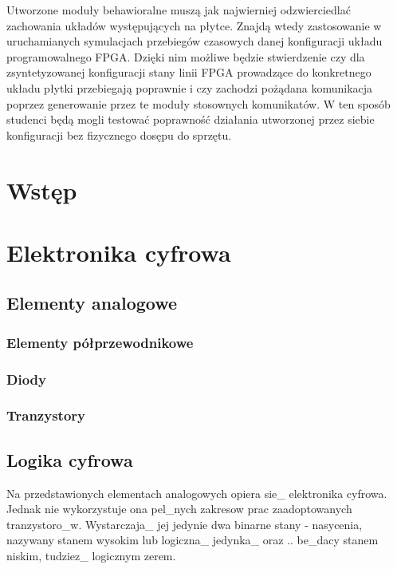 \documentclass[a4paper,12pt]{article}
\begin{document}
Utworzone moduły behawioralne muszą jak najwierniej odzwierciedlać zachowania układów występujących na płytce.
Znajdą wtedy zastosowanie w uruchamianych symulacjach przebiegów czasowych danej konfiguracji układu programowalnego FPGA. Dzięki nim możliwe będzie stwierdzenie czy dla zsyntetyzowanej konfiguracji stany linii FPGA prowadzące do konkretnego układu płytki przebiegają poprawnie i czy zachodzi pożądana komunikacja poprzez generowanie przez te moduły stosownych komunikatów. W ten sposób studenci będą mogli testować poprawność działania utworzonej przez siebie konfiguracji bez fizycznego dosępu do sprzętu.


\section{Wstęp}


\section{Elektronika cyfrowa}


\subsection{Elementy analogowe}

\subsubsection{Elementy półprzewodnikowe}

\subsubsection{Diody}

\subsubsection{Tranzystory}


\subsection{Logika cyfrowa}

Na przedstawionych elementach analogowych opiera sie_ elektronika cyfrowa. Jednak nie wykorzystuje ona pel_nych zakresow prac zaadoptowanych tranzystoro_w. Wystarczaja_ jej jedynie dwa binarne stany - nasycenia, nazywany stanem wysokim lub logiczna_ jedynka_ oraz .. be_dacy stanem niskim, tudziez_ logicznym zerem.
\end{document}
